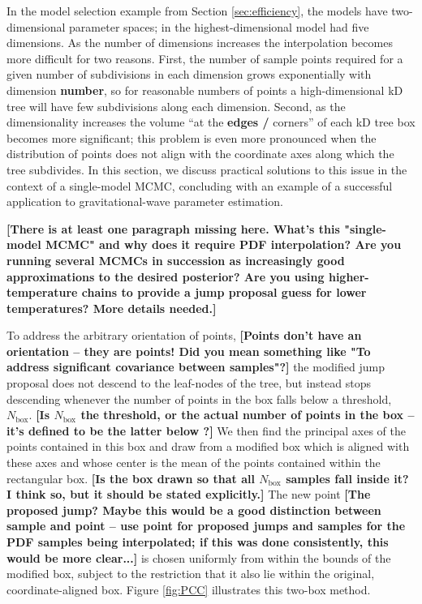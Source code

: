 \documentclass{iopart}
\newcommand{\Nbox}{N_\mathrm{box}}
\newcommand{\ilya}[1]{{\color{red} \bf #1}}
\begin{document}
In the model selection example from Section \ref{sec:efficiency}, the
models have two-dimensional parameter spaces; in \cite{Farr2010} the
highest-dimensional model had five dimensions.  As the number of
dimensions increases the interpolation becomes more difficult for two
reasons.  First, the number of sample points required for a given
number of subdivisions in each dimension grows exponentially with
dimension \ilya{number}, so for reasonable numbers of points a high-dimensional kD
tree will have few subdivisions along each dimension.  Second, as
the dimensionality increases the volume ``at the \ilya{edges /} corners'' of each kD
tree box becomes more significant; this problem is even more
pronounced when the distribution of points does not align with the
coordinate axes along which the tree subdivides.  In this section, we
discuss practical solutions to this issue in the context of a
single-model MCMC, concluding with an example of a successful
application to gravitational-wave parameter estimation.

\ilya{[There is at least one paragraph missing here.  What's this "single-model MCMC" and why does it require PDF interpolation?  Are you running several MCMCs in succession as increasingly good approximations to the desired posterior?  Are you using higher-temperature chains to provide a jump proposal guess for lower temperatures?   More details needed.]}

To address the arbitrary orientation of points, \ilya{[Points don't have an orientation -- they are points!  Did you mean something like "To address significant covariance between samples"?]} 
 the modified jump
proposal does not descend to the leaf-nodes of the tree, but instead
stops descending whenever the number of points in the box falls below
a threshold, $\Nbox$. \ilya{[Is $\Nbox$ the threshold, or the actual number of points in the box -- it's defined to be the latter below \Eref{modforward}?]}  We then find the principal axes of the points
contained in this box and draw from a modified box which is aligned
with these axes and whose center is the mean of the points contained
within the rectangular box. \ilya{[Is the box drawn so that all $\Nbox$ samples fall inside it?  I think so, but it should be stated explicitly.]}  The new point \ilya{[The proposed jump?  Maybe this would be a good distinction between sample and point -- use point for proposed jumps and samples for the PDF samples being interpolated; if this was done consistently, this would be more clear...]} is chosen uniformly from
within the bounds of the modified box, subject to the restriction that
it also lie within the original, coordinate-aligned box.  Figure
\ref{fig:PCC} illustrates this two-box method.
\end{document}
